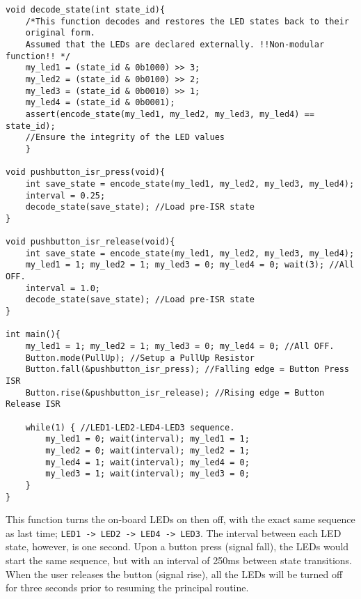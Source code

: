 \documentclass{article}
\begin{document}
\begin{verbatim}
void decode_state(int state_id){
    /*This function decodes and restores the LED states back to their
    original form.
    Assumed that the LEDs are declared externally. !!Non-modular function!! */
    my_led1 = (state_id & 0b1000) >> 3;
    my_led2 = (state_id & 0b0100) >> 2;
    my_led3 = (state_id & 0b0010) >> 1;
    my_led4 = (state_id & 0b0001);
    assert(encode_state(my_led1, my_led2, my_led3, my_led4) == state_id);
    //Ensure the integrity of the LED values
    }

void pushbutton_isr_press(void){
    int save_state = encode_state(my_led1, my_led2, my_led3, my_led4);
    interval = 0.25;
    decode_state(save_state); //Load pre-ISR state
}

void pushbutton_isr_release(void){
    int save_state = encode_state(my_led1, my_led2, my_led3, my_led4);
    my_led1 = 1; my_led2 = 1; my_led3 = 0; my_led4 = 0; wait(3); //All OFF.
    interval = 1.0;
    decode_state(save_state); //Load pre-ISR state
}

int main(){
    my_led1 = 1; my_led2 = 1; my_led3 = 0; my_led4 = 0; //All OFF.
    Button.mode(PullUp); //Setup a PullUp Resistor
    Button.fall(&pushbutton_isr_press); //Falling edge = Button Press ISR
    Button.rise(&pushbutton_isr_release); //Rising edge = Button Release ISR
    
    while(1) { //LED1-LED2-LED4-LED3 sequence.
        my_led1 = 0; wait(interval); my_led1 = 1;
        my_led2 = 0; wait(interval); my_led2 = 1;
        my_led4 = 1; wait(interval); my_led4 = 0;
        my_led3 = 1; wait(interval); my_led3 = 0;
    }
}
\end{verbatim}

This function turns the on-board LEDs on then off, with the exact same sequence as last time; \texttt{LED1 -> LED2 -> LED4 -> LED3}. The interval between each LED state, however, is one second. Upon a button press (signal fall), the LEDs would start the same sequence, but with an interval of 250ms between state transitions. When the user releases the button (signal rise), all the LEDs will be turned off for three seconds prior to resuming the principal routine.
\end{document}
